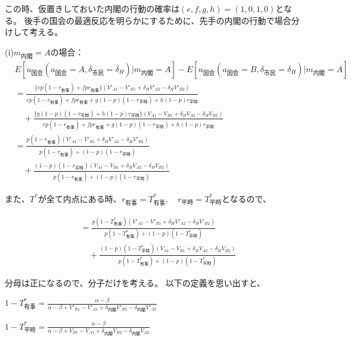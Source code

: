 \documentclass[main.tex]{subfiles}
\begin{document}
この時、仮置きしておいた内閣の行動の確率は$(e,f,g,h) = (1,0,1,0)$となる。
後手の国会の最適反応を明らかにするために、先手の内閣の行動で場合分けして考える。



(i)$m_{内閣}=A$の場合：
\begin{align*}
    & E[u_{国会}(a_{国会}=A, \delta_{市民}=\delta_H) | m_{内閣} = A  ] - E[u_{国会}(a_{国会}=B, \delta_{市民}=\delta_H) | m_{内閣} = A  ]\\[1em]
    &= \frac{ \{ep(1-r_{有事}) +  fpr_{有事}\}(V'_{A1} -V'_{B1} + \delta_H V'_{A2} - \delta_H V'_{B2})  }{ ep(1-r_{有事}) + fpr_{有事} + g(1-p)(1-r_{平時}) + h(1-p)r_{平時} }\\[1em]
    &\quad + \frac{ \{g(1-p)(1-r_{平時}) + h(1-p)r_{平時}\}(V_{A1} - V_{B1} + \delta_H V_{A2} - \delta_H V_{B2} ) }{ ep(1-r_{有事}) + fpr_{有事} + g(1-p)(1-r_{平時}) + h(1-p)r_{平時} }\\[1em]
    &= \frac{ p(1-r_{有事}) (V'_{A1} -V'_{B1} + \delta_H V'_{A2} - \delta_H V'_{B2})  }{ p(1-r_{有事})  + (1-p)(1-r_{平時}) }\\[1em]
    &\quad + \frac{ (1-p)(1-r_{平時})(V_{A1} - V_{B1} + \delta_H V_{A2} - \delta_H V_{B2} ) }{ p(1-r_{有事}) +  (1-p)(1-r_{平時}) }
\end{align*}

また、$T^*$が全て内点にある時、$r_{有事}=T^*_{有事}, \quad r_{平時} = T^*_{平時}$となるので、

\begin{align*}
    &= \frac{ p(1-T^*_{有事}) (V'_{A1} -V'_{B1} + \delta_H V'_{A2} - \delta_H V'_{B2})  }{ p(1-T^*_{有事})  + (1-p)(1-T^*_{平時}) }\\[1em]
    &\quad + \frac{ (1-p)(1-T^*_{平時})(V_{A1} - V_{B1} + \delta_H V_{A2} - \delta_H V_{B2} ) }{ p(1-T^*_{有事}) +  (1-p)(1-T^*_{平時}) }
\end{align*}


分母は正になるので、分子だけを考える。
以下の定義を思い出すと、

\begin{definition} \Large$1 - T^*_{有事} = \frac{ \alpha-\beta }{ \alpha-\beta + V'_{B1}-V'_{A1} + \delta_{内閣}V'_{B2} - \delta_{内閣}V'_{A2} }$ \end{definition}

\begin{definition} \Large$1 - T^*_{平時} = \frac{ \alpha-\beta }{ \alpha-\beta + V_{B1}-V_{A1} + \delta_{内閣}V_{B2} - \delta_{内閣}V_{A2} }$ \end{definition}
\end{document}
